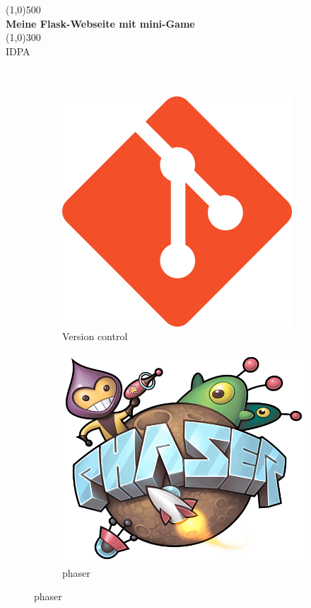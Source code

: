 \documentclass{article}
\begin{document}
\begin{titlepage}
    \begin{center}
    \line(1,0){500} \\ %
    [3mm]%
    \huge{\bfseries Meine Flask-Webseite mit mini-Game} \\
    [2mm]%
    \line(1,0){300} \\ %
    [1.5cm]%
    \textsc{\LARGE IDPA} \\
    [0.75cm]
     \\
    \\








\vspace{2cm}
    \begin{figure}[ht]
    \centering
    \begin{subfigure}{.5\textwidth}
      \centering
      \includegraphics[width=.5\linewidth]{git_logo}
      \caption{Version control}
      \label{fig:sub1}
    \end{subfigure}%
    \begin{subfigure}{.5\textwidth}
      \centering
      \includegraphics[width=.5\linewidth]{phaser}
      \caption{phaser}
      \label{fig:sub2}
    \end{subfigure}
    \end{figure}
    \vspace{3cm}













\end{center}
\end{titlepage}
\end{document}

